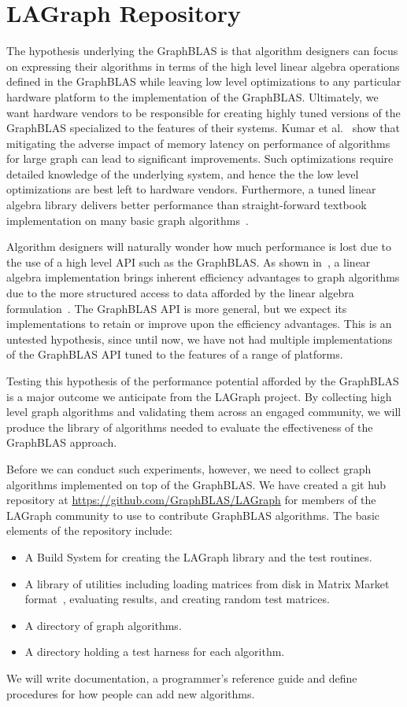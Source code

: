 \section{LAGraph Repository}
\label{sec:repo}

The hypothesis underlying the GraphBLAS is that algorithm designers can focus on expressing their algorithms
in terms of the high level linear algebra operations defined in the GraphBLAS while leaving low level
optimizations to any particular hardware platform to the implementation of the GraphBLAS.  Ultimately, 
we want hardware vendors to be responsible for creating highly tuned versions of the GraphBLAS
specialized to the features of their systems.
Kumar et al.~\cite{KuHPEC2016} show that mitigating the adverse impact of memory
latency on performance of algorithms for large graph can lead to significant improvements.
Such optimizations require detailed knowledge of the underlying system, and hence the 
the low level optimizations are best left to hardware vendors.
Furthermore, a tuned linear algebra library delivers
better performance than straight-forward textbook implementation on many basic graph algorithms~\cite{KuJour}.

Algorithm designers will naturally wonder how much performance is lost due to the use of a high 
level API such as the GraphBLAS.  As shown in~\cite{KuJour}, a linear algebra 
implementation brings inherent efficiency advantages to 
graph algorithms due to the more structured access to data afforded by the linear algebra 
formulation~\cite{KuJour}.
The GraphBLAS API is more general, but we expect its implementations to retain or improve upon
the efficiency advantages.
This is an untested hypothesis, since until now, we have not had multiple 
implementations of the GraphBLAS API tuned to the features of a range of platforms.

Testing this hypothesis of the performance potential afforded by the GraphBLAS is a major outcome
we anticipate from the LAGraph project.  By collecting high level graph algorithms and validating them
across an engaged community, we will produce the library of algorithms needed to evaluate the 
effectiveness of the GraphBLAS approach.

Before we can conduct such experiments, however, we need to collect graph algorithms implemented on 
top of the GraphBLAS. We have created a git hub repository at
\url{https://github.com/GraphBLAS/LAGraph} for members of the LAGraph community to 
use to contribute GraphBLAS algorithms. The basic elements of the repository include:
\begin{itemize}
\item A Build System for creating the LAGraph library and the test routines.
\item A library of utilities including loading matrices from disk in Matrix Market format~\cite{MM},
    evaluating results, and creating random test matrices.
\item A directory of graph algorithms.
\item A directory holding a test harness for each algorithm.
\end{itemize}

We will write documentation, a programmer's reference guide and define procedures for how people
can add new algorithms.  
